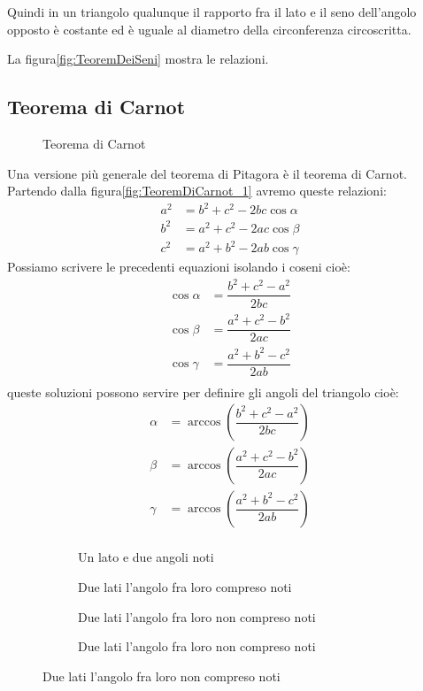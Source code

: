 Quindi in un triangolo qualunque il rapporto fra il lato e il seno dell'angolo opposto è costante ed è uguale al diametro della circonferenza circoscritta. 

La figura\nobs\vref{fig:TeoremDeiSeni} mostra le relazioni.
\subsection{Teorema di Carnot}
\begin{figure}
	\centering
	
	\caption{Teorema di Carnot}
	\label{fig:TeoremDiCarnot_1}
\end{figure}
Una versione più generale del teorema di Pitagora è il teorema di Carnot. Partendo dalla figura\nobs\vref{fig:TeoremDiCarnot_1} avremo queste relazioni:
\begin{align*}
a^2&=b^2+c^2-2bc\cos\alpha\\
b^2&=a^2+c^2-2ac\cos\beta\\
c^2&=a^2+b^2-2ab\cos\gamma
\end{align*}
Possiamo scrivere le precedenti equazioni isolando i coseni cioè:
\begin{align*}
\cos\alpha&=\dfrac{b^2+c^2-a^2}{2bc}\\
\cos\beta&=\dfrac{a^2+c^2-b^2}{2ac}\\
\cos\gamma&=\dfrac{a^2+b^2-c^2}{2ab}\\
\end{align*}
queste soluzioni possono servire per definire gli angoli del triangolo cioè:
\begin{align*}
\alpha&=\arccos(\dfrac{b^2+c^2-a^2}{2bc})\\
\beta&=\arccos(\dfrac{a^2+c^2-b^2}{2ac})\\
\gamma&=\arccos(\dfrac{a^2+b^2-c^2}{2ab})\\
\end{align*}
\begin{figure}
	\begin{subfigure}[b]{.5\linewidth}
		\centering

	\caption{Un lato e due angoli noti}
	\label{fig:risTriangQqualunque_1}
	\end{subfigure}%
	\begin{subfigure}[b]{.5\linewidth}
		\centering
	
		\caption{Due lati l'angolo fra loro compreso noti}
		\label{fig:risTriangQqualunque_2}
	\end{subfigure}
	\begin{subfigure}[b]{.5\linewidth}
		\centering
		
		\caption{Due lati l'angolo fra loro non compreso noti}
		\label{fig:risTriangQqualunque_3}
	\end{subfigure}%
	\begin{subfigure}[b]{.5\linewidth}
		\centering
		
		\caption{Due lati l'angolo fra loro non compreso noti}
		\label{fig:risTriangQqualunque_4}
	\end{subfigure}
	\label{fig:RisoluzioneTriangoliQualunque}
\end{figure}
